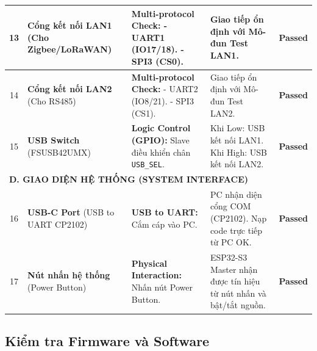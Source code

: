 \begin{longtable}{|c|p{3.5cm}|p{5cm}|p{3.5cm}|c|}
            13 & \textbf{Cổng kết nối LAN1} \newline (Cho Zigbee/LoRaWAN) & \textbf{Multi-protocol Check:} \newline - UART1 (IO17/18). \newline - SPI3 (CS0). & Giao tiếp ổn định với Mô-đun Test LAN1. & \textcolor{modern_blue}{\textbf{Passed}} \\ \hline

            14 & \textbf{Cổng kết nối LAN2} \newline (Cho RS485) & \textbf{Multi-protocol Check:} \newline - UART2 (IO8/21). \newline - SPI3 (CS1). & Giao tiếp ổn định với Mô-đun Test LAN2. & \textcolor{modern_blue}{\textbf{Passed}} \\ \hline

            15 & \textbf{USB Switch} \newline (FSUSB42UMX) & \textbf{Logic Control (GPIO):} \newline Slave điều khiển chân \texttt{USB\_SEL}. & Khi Low: USB kết nối LAN1. Khi High: USB kết nối LAN2. & \textcolor{modern_blue}{\textbf{Passed}} \\ \hline

            \multicolumn{5}{|l|}{\textbf{D. GIAO DIỆN HỆ THỐNG (SYSTEM INTERFACE)}} \\ \hline

            16 & \textbf{USB-C Port} \newline (USB to UART CP2102) & \textbf{USB to UART:} \newline Cắm cáp vào PC. & PC nhận diện cổng COM (CP2102). Nạp code trực tiếp từ PC OK. & \textcolor{modern_blue}{\textbf{Passed}} \\ \hline

            17 & \textbf{Nút nhấn hệ thống} \newline (Power Button) & \textbf{Physical Interaction:} \newline Nhấn nút Power Button. & ESP32-S3 Master nhận được tín hiệu từ nút nhấn và bật/tắt nguồn. & \textcolor{modern_blue}{\textbf{Passed}} \\ \hline

        \end{longtable}

    \subsection{Kiểm tra Firmware và Software}

